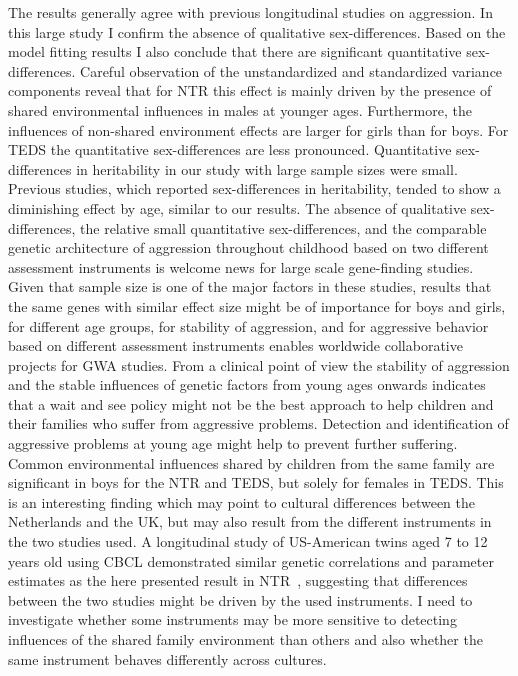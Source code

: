 The results generally agree with previous longitudinal studies on aggression.
In this large study I confirm the absence of qualitative sex-differences.
Based on the model fitting results I also conclude that there are significant quantitative sex-differences.
Careful observation of the unstandardized and standardized variance components reveal that for NTR this effect is mainly driven by the presence of shared environmental influences in males at younger ages.
Furthermore, the influences of non-shared environment effects are larger for girls than for boys.
For TEDS the quantitative sex-differences are less pronounced.
Quantitative sex-differences in heritability in our study with large sample sizes were small.
Previous studies, which reported sex-differences in heritability, tended to show a diminishing effect by age, similar to our results.
The absence of qualitative sex-differences, the relative small quantitative sex-differences, and the comparable genetic architecture of aggression throughout childhood based on two different assessment instruments is welcome news for large scale gene-finding studies.
Given that sample size is one of the major factors in these studies, results that the same genes with similar effect size might be of importance for boys and girls, for different age groups, for stability of aggression, and for aggressive behavior based on different assessment instruments enables worldwide collaborative projects for GWA studies. 
From a clinical point of view the stability of aggression and the stable influences of genetic factors from young ages onwards indicates that a wait and see policy might not be the best approach to help children and their families who suffer from aggressive problems.
Detection and identification of aggressive problems at young age might help to prevent further suffering.
Common environmental influences shared by children from the same family are significant in boys for the NTR and TEDS, but solely for females in TEDS.
This is an interesting finding which may point to cultural differences between the Netherlands and the UK, but may also result from the different instruments in the two studies used.
A longitudinal study of US-American twins aged 7 to 12 years old using CBCL demonstrated similar genetic correlations and parameter estimates as the here presented result in NTR~\cite{Haberstick2006}, suggesting that differences between the two studies might be driven by the used instruments.
I need to investigate whether some instruments may be more sensitive to detecting influences of the shared family environment than others and also whether the same instrument behaves differently across cultures.
